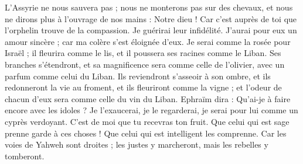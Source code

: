 \begin{multicols}{2}
L'Assyrie ne nous sauvera pas ; nous ne monterons pas sur des chevaux, et nous ne dirons plus à l'ouvrage de nos mains : Notre dieu ! Car c’est auprès de toi que l'orphelin trouve de la compassion.
Je guérirai leur infidélité. J’aurai pour eux un amour sincère ; car ma colère s’est éloignée d'eux.
Je serai comme la rosée pour Israël ; il fleurira comme le lis, et il poussera ses racines comme le Liban.
Ses branches s’étendront, et sa magnificence sera comme celle de l'olivier, avec un parfum comme celui du Liban.
Ils reviendront s’asseoir à son ombre, et ils redonneront la vie au froment, et ils fleuriront comme la vigne ; et l'odeur de chacun d'eux sera comme celle du vin du Liban.
Ephraïm dira : Qu'ai-je à faire encore avec les idoles ? Je l'exaucerai, je le regarderai, je serai pour lui comme un cyprès verdoyant. C’est de moi que tu recevras ton fruit.
Que celui qui est sage prenne garde à ces choses ! Que celui qui est intelligent les comprenne. Car les voies de Yahweh sont droites ; les justes y marcheront, mais les rebelles y tomberont.
\PPE{}
\end{multicols}
